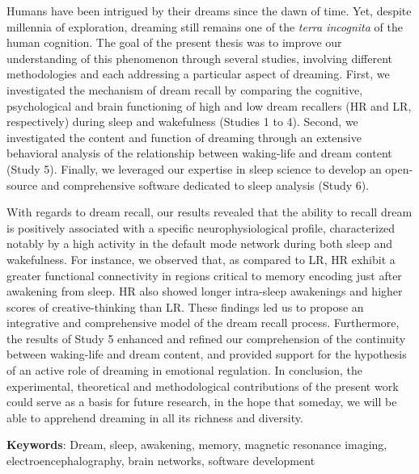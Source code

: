 \label{sec:abstract}
\vspace*{-10mm}

Humans have been intrigued by their dreams since the dawn of time. Yet, despite millennia of exploration, dreaming still remains one of the \emph{terra incognita} of the human cognition. The goal of the present thesis was to improve our understanding of this phenomenon through several studies, involving different methodologies and each addressing a particular aspect of dreaming. First, we investigated the mechanism of dream recall by comparing the cognitive, psychological and brain functioning of high and low dream recallers (HR and LR, respectively) during sleep and wakefulness (Studies 1 to 4). Second, we investigated the content and function of dreaming through an extensive behavioral analysis of the relationship between waking-life and dream content (Study 5). Finally, we leveraged our expertise in sleep science to develop an open-source and comprehensive software dedicated to sleep analysis (Study 6).

With regards to dream recall, our results revealed that the ability to recall dream is positively associated with a specific neurophysiological profile, characterized notably by a high activity in the default mode network during both sleep and wakefulness. For instance, we observed that, as compared to LR, HR exhibit a greater functional connectivity in regions critical to memory encoding just after awakening from sleep. HR also showed longer intra-sleep awakenings and higher scores of creative-thinking than LR. These findings led us to propose an integrative and comprehensive model of the dream recall process. Furthermore, the results of Study 5 enhanced and refined our comprehension of the continuity between waking-life and dream content, and provided support for the hypothesis of an active role of dreaming in emotional regulation. In conclusion, the experimental, theoretical and methodological contributions of the present work could serve as a basis for future research, in the hope that someday, we will be able to apprehend dreaming in all its richness and diversity.


\textbf{Keywords}: Dream, sleep, awakening, memory, magnetic resonance imaging, electroencephalography, brain networks, software development

\cleardoublepage

\label{sec:résumé}
\vspace*{-10mm}

